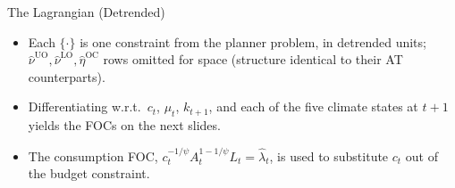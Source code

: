 \documentclass[aspectratio=169,11pt]{beamer}
\begin{document}
\begin{frame}{The Lagrangian (Detrended)}
\vspace{-0.1cm}

\vspace{0.2cm}
\begin{itemize}
    \item Each $\{\cdot\}$ is one constraint from the planner problem, in detrended units; $\hat{\nu}^{\text{UO}}, \hat{\nu}^{\text{LO}}, \hat{\eta}^{\text{OC}}$ rows omitted for space (structure identical to their AT counterparts).
    \item Differentiating w.r.t.\ $c_t$, $\mu_t$, $k_{t+1}$, and each of the five climate states at $t+1$ yields the FOCs on the next slides.
    \item The consumption FOC, $c_t^{-1/\psi}A_{t}^{1-1/\psi}L_{t} = \hat{\lambda}_t$, is used to substitute $c_t$ out of the budget constraint.
\end{itemize}
\end{frame}
\end{document}

